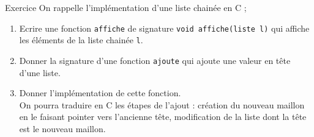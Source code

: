 \documentclass[10pt]{beamer}
\begin{document}
\begin{frame}{\Ctitle}{\stitle}
	\begin{exampleblock}{Exercice}
		On rappelle l'implémentation d'une liste chainée en C ;
		\begin{enumerate}
			\item<2-> Ecrire une fonction {\tt affiche} de signature \texttt{void affiche(liste l)} qui affiche les éléments de la liste chainée {\tt l}.
			\item<3-> Donner la signature d'une fonction {\tt ajoute} qui ajoute une valeur en tête d'une liste.
			\item<4-> Donner l'implémentation de cette fonction.\\
				{\small \aide \; On pourra traduire en C les  étapes  de l'ajout : création du nouveau maillon en le faisant pointer vers l'ancienne tête, modification de la liste dont la tête est le nouveau maillon.}
		\end{enumerate}
	\end{exampleblock}
\end{frame}
\end{document}
